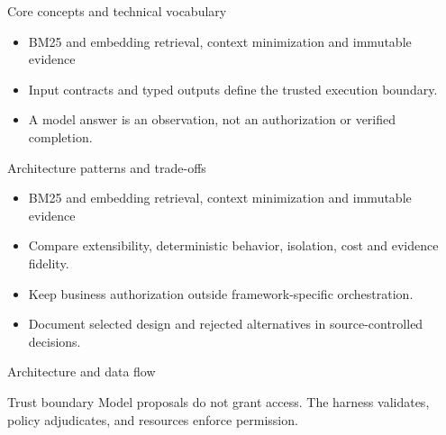 \documentclass[aspectratio=169,10pt]{beamer}
\begin{document}
\begin{frame}{Core concepts and technical vocabulary}
\small
\begin{itemize}
\item BM25 and embedding retrieval, context minimization and immutable evidence
\item Input contracts and typed outputs define the trusted execution boundary.
\item A model answer is an observation, not an authorization or verified completion.
\end{itemize}

\end{frame}

\begin{frame}{Architecture patterns and trade-offs}
\small
\begin{itemize}
\item BM25 and embedding retrieval, context minimization and immutable evidence
\item Compare extensibility, deterministic behavior, isolation, cost and evidence fidelity.
\item Keep business authorization outside framework-specific orchestration.
\item Document selected design and rejected alternatives in source-controlled decisions.
\end{itemize}

\end{frame}

\begin{frame}{Architecture and data flow}
\small
\centering
{}
\vspace{0.6cm}
\begin{block}{Trust boundary}
Model proposals do not grant access. The harness validates, policy adjudicates, and resources enforce permission.
\end{block}
\end{frame}
\end{document}
